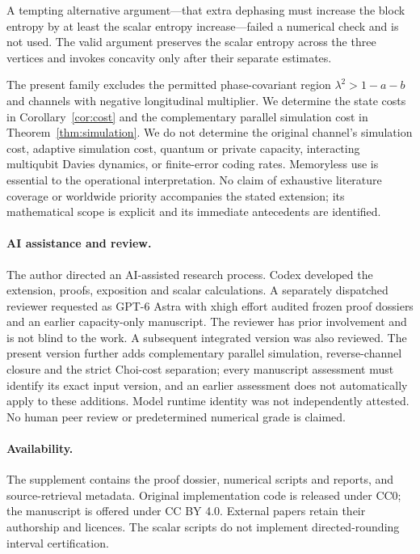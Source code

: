 \documentclass[11pt]{article}
\begin{document}
A tempting alternative argument---that extra dephasing must increase the block entropy by at least the scalar entropy increase---failed a numerical check and is not used. The valid argument preserves the scalar entropy across the three vertices and invokes concavity only after their separate estimates.

The present family excludes the permitted phase-covariant region $\lambda^2>1-a-b$ and channels with negative longitudinal multiplier. We determine the state costs in Corollary~\ref{cor:cost} and the complementary parallel simulation cost in Theorem~\ref{thm:simulation}. We do not determine the original channel's simulation cost, adaptive simulation cost, quantum or private capacity, interacting multiqubit Davies dynamics, or finite-error coding rates. Memoryless use is essential to the operational interpretation. No claim of exhaustive literature coverage or worldwide priority accompanies the stated extension; its mathematical scope is explicit and its immediate antecedents are identified.

\paragraph{AI assistance and review.}
The author directed an AI-assisted research process. Codex developed the extension, proofs, exposition and scalar calculations. A separately dispatched reviewer requested as GPT-6 Astra with xhigh effort audited frozen proof dossiers and an earlier capacity-only manuscript. The reviewer has prior involvement and is not blind to the work. A subsequent integrated version was also reviewed. The present version further adds complementary parallel simulation, reverse-channel closure and the strict Choi-cost separation; every manuscript assessment must identify its exact input version, and an earlier assessment does not automatically apply to these additions. Model runtime identity was not independently attested. No human peer review or predetermined numerical grade is claimed.

\paragraph{Availability.}
The supplement contains the proof dossier, numerical scripts and reports, and source-retrieval metadata. Original implementation code is released under CC0; the manuscript is offered under CC BY 4.0. External papers retain their authorship and licences. The scalar scripts do not implement directed-rounding interval certification.
\end{document}
